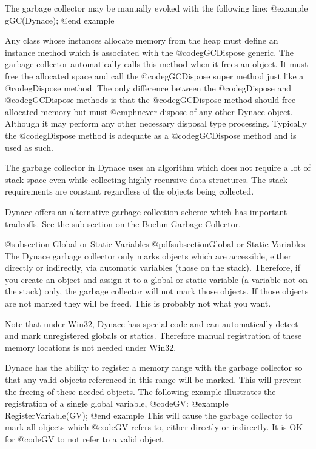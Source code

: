 The garbage collector may be manually evoked with the following line:
@example
        gGC(Dynace);
@end example

Any class whose instances allocate memory from the heap must define an
instance method which is associated with the @code{gGCDispose} generic.
The garbage collector automatically calls this method when it frees an
object.  It must free the allocated space and call the @code{gGCDispose}
super method just like a @code{gDispose} method.  The only difference
between the @code{gDispose} and @code{gGCDispose} methods is that the
@code{gGCDispose} method should free allocated memory but must
@emph{never} dispose of any other Dynace object.  Although it may perform
any other necessary disposal type processing.  Typically the
@code{gDispose} method is adequate as a @code{gGCDispose} method and is
used as such.

The garbage collector in Dynace uses an algorithm which does not require a
lot of stack space even while collecting highly recursive data
structures.  The stack requirements are constant regardless of the
objects being collected.

Dynace offers an alternative garbage collection scheme which has important
tradeoffs.  See the sub-section on the Boehm Garbage Collector.



@subsection Global or Static Variables
@pdfsubsection{Global or Static Variables}
The Dynace garbage collector only marks objects which are accessible, either
directly or indirectly, via automatic variables (those on the stack).
Therefore, if you create an object and assign it to a global or static
variable (a variable not on the stack) only, the garbage collector will
not mark those objects.  If those objects are not marked they will be
freed.  This is probably not what you want.

Note that under Win32, Dynace has special code and can automatically
detect and mark unregistered globals or statics.  Therefore manual
registration of these memory locations is not needed under Win32.

Dynace has the ability to register a memory range with the garbage collector
so that any valid objects referenced in this range will be marked.  This
will prevent the freeing of these needed objects.  The following example
illustrates the registration of a single global variable, @code{GV}:
@example
        RegisterVariable(GV);
@end example
This will cause the garbage collector to mark all objects which @code{GV}
refers to, either directly or indirectly.  It is OK for @code{GV} to not
refer to a valid object.

